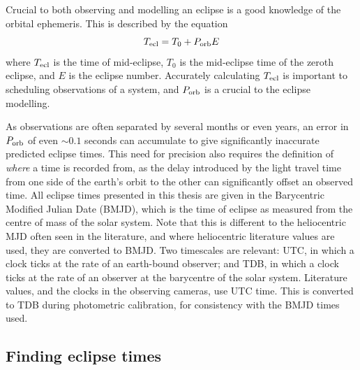 Crucial to both observing and modelling an eclipse is a good knowledge of the orbital ephemeris. This is described by the equation
\begin{equation}
    \label{eqn:modelling:general ephemeris equation}
    T_{\rm ecl} = T_0 + P_{\rm orb} E
\end{equation}
where $T_{\rm ecl}$ is the time of mid-eclipse, $T_0$ is the mid-eclipse time of the zeroth eclipse, and $E$ is the eclipse number. Accurately calculating $T_{\rm ecl}$ is important to scheduling observations of a system, and $P_{\rm orb}$ is a crucial to the eclipse modelling.

As observations are often separated by several months or even years, an error in $P_{\rm orb}$ of even $\sim 0.1$ seconds can accumulate to give significantly inaccurate predicted eclipse times. This need for precision also requires the definition of {\it where} a time is recorded from, as the delay introduced by the light travel time from one side of the earth's orbit to the other can significantly offset an observed time. All eclipse times presented in this thesis are given in the Barycentric Modified Julian Date (BMJD), which is the time of eclipse as measured from the centre of mass of the solar system. Note that this is different to the heliocentric MJD often seen in the literature, and where heliocentric literature values are used, they are converted to BMJD.
Two timescales are relevant: UTC, in which a clock ticks at the rate of an earth-bound observer; and TDB, in which a clock ticks at the rate of an observer at the barycentre of the solar system. Literature values, and the clocks in the observing cameras, use UTC time. This is converted to TDB during photometric calibration, for consistency with the BMJD times used.

\subsection{Finding eclipse times}
\label{sect:modelling:finding eclipse times}


